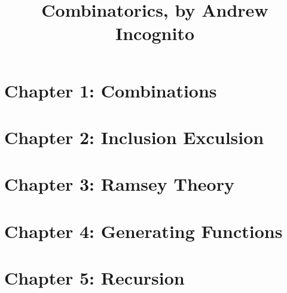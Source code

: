 \documentclass[12pt,handout,twocolumn,twoside,wordchoicegiven]{xourse}
\title{Combinatorics, by Andrew Incognito}
\begin{document}
\maketitle

\setcounter{tocdepth}{2}





\part{Chapter 1: Combinations}

\part{Chapter 2: Inclusion Exculsion}

\part{Chapter 3: Ramsey Theory}
\part{Chapter 4: Generating Functions}
\part{Chapter 5: Recursion}
\end{document}
